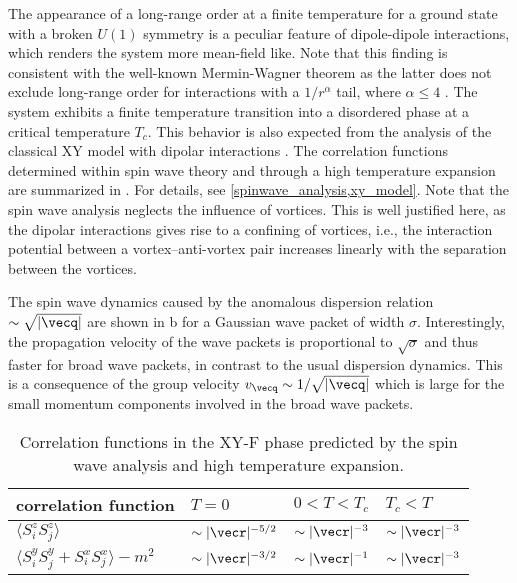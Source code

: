 The appearance of a long-range order at a finite temperature for a ground state with a broken $U(1)$ symmetry is a peculiar feature of dipole-dipole interactions, which renders the system more mean-field like.
Note that this finding is consistent with the well-known Mermin-Wagner theorem as the latter does not exclude long-range order for interactions with a $1/r^\alpha$ tail, where $\alpha \le 4$ \cite{Mermin1966,DeSousa2005}.
The system exhibits a finite temperature transition into a disordered phase at a critical temperature $T_{c}$.
This behavior is also expected from the analysis of the classical XY model with dipolar interactions \cite{Bruno2001}.
The correlation functions determined within spin wave theory and through a high temperature expansion are summarized in .
For details, see \cref{spinwave_analysis,xy_model}.
Note that the spin wave analysis neglects the influence of vortices.
This is well justified here, as the dipolar interactions gives rise to a confining of vortices, i.e., the interaction potential between a vortex--anti-vortex pair increases linearly with the separation between the vortices.

The spin wave dynamics caused by the anomalous dispersion relation $\sim \sqrt{|{\vecq}|}$ are shown in b for a Gaussian wave packet of width $\sigma$. Interestingly, the propagation velocity of the wave packets is proportional to $\sqrt{\sigma}$ and thus faster for broad wave packets, in contrast to the usual dispersion dynamics. This is a consequence of the group velocity $v_{\vecq} \sim 1/\sqrt{|{\vecq}|}$ which is large for the small momentum components involved in the broad wave packets.

\begin{table}
    \centering
    \begin{tabu} to .8\textwidth {X[1.8]X[c]X[c]X[c]}
        \toprule
        correlation function & $T=0$ & $0 < T < T_{c}$ & $T_{c}< T$ \\
        \midrule
        $ \langle S^{z}_{i} S^{z}_{j}\rangle$  &$ \sim |{\vecr}|^{-5/2}$  & $\sim |{\vecr}|^{-3}$ &  $\sim |{\vecr}|^{-3}$ \\
        $ \langle S^{y}_{i} S^{y}_{j}+ S^{x}_{i} S^{x}_{j}\rangle- m^2$  &$ \sim |{\vecr}|^{-3/2}$ &  $\sim |{\vecr}|^{-1}$ &  $\sim |{\vecr}|^{-3}$ \\
        \bottomrule
    \end{tabu}
    \caption{Correlation functions in the XY-F phase predicted by the spin wave analysis and high temperature expansion.}
\end{table}


